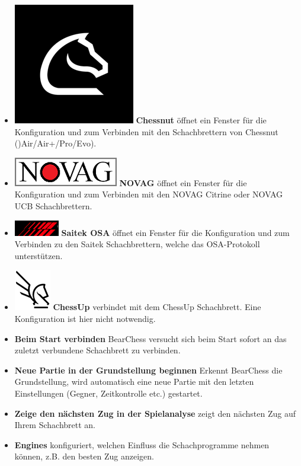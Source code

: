 \documentclass[11pt,a4paper]{article}
\begin{document}
\begin{itemize}
		\item  \includegraphics[scale=0.1]{chessnut.png} \textbf{Chessnut} öffnet ein Fenster für die Konfiguration und zum Verbinden mit den Schachbrettern von Chessnut ()Air/Air+/Pro/Evo). 
		\item  \includegraphics[scale=0.3]{novag48.PNG} \textbf{NOVAG} öffnet ein Fenster für die Konfiguration und zum Verbinden mit den NOVAG Citrine oder NOVAG UCB Schachbrettern.
		\item  \includegraphics[scale=0.4]{Saitek_logo.PNG} \textbf{Saitek OSA} öffnet ein Fenster für die Konfiguration und zum Verbinden zu den Saitek Schachbrettern, welche das OSA-Protokoll unterstützen.		
		\item  \includegraphics[scale=0.4]{ChessUp.png} \textbf{ChessUp} verbindet mit dem  ChessUp Schachbrett. Eine Konfiguration ist hier nicht notwendig.
		\item \textbf{Beim Start verbinden} BearChess versucht sich beim Start sofort an das zuletzt verbundene Schachbrett zu verbinden. 	
		\item \textbf{Neue Partie in der Grundstellung beginnen} Erkennt BearChess die Grundstellung, wird automatisch eine neue Partie mit den letzten Einstellungen (Gegner, Zeitkontrolle etc.) gestartet.
		\item \textbf{Zeige den nächsten Zug in der Spielanalyse} zeigt den nächsten Zug auf Ihrem Schachbrett an.
		\item \textbf{Engines} konfiguriert, welchen Einfluss die Schachprogramme nehmen können, z.B. den besten Zug anzeigen.
		
	\end{itemize}
	
\end{document}
